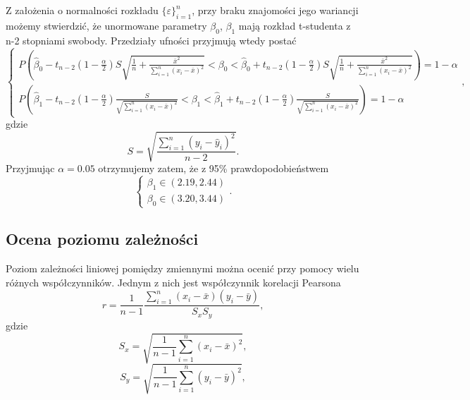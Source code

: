 \documentclass{article}
\theoremstyle{break}
\begin{document}
Z założenia o normalności rozkładu $\{\varepsilon\}_{i=1}^{n}$, przy braku znajomości jego wariancji możemy stwierdzić, że unormowane parametry $\beta_0$, $\beta_1$ mają rozkład t-studenta z n-2 stopniami swobody. Przedziały ufności przyjmują wtedy postać
\begin{equation}
\left\{ \begin{array}{ll}
	P\left(\hat{\beta}_{0}-t_{n-2}(1-\frac{\alpha}{2})S\sqrt{\frac{1}{n}+\frac{\bar{x}^{2}}{\sum_{i=1}^{n}(x_i-\bar{x})^2}} < \beta_{0} < \hat{\beta}_{0}+t_{n-2}(1-\frac{\alpha}{2})S\sqrt{\frac{1}{n}+\frac{\bar{x}^{2}}{\sum_{i=1}^{n}(x_i-\bar{x})^2}}\right) = 1-\alpha\\
	P\left(\hat{\beta}_{1}-t_{n-2}(1-\frac{\alpha}{2})\frac{S}{\sqrt{\sum_{i=1}^{n}(x_i-\bar{x})^2}} < \beta_{1} < \hat{\beta}_{1}+t_{n-2}(1-\frac{\alpha}{2})\frac{S}{\sqrt{\sum_{i=1}^{n}(x_i-\bar{x})^2}}\right) = 1-\alpha
\end{array} \right.,
\end{equation} gdzie
\begin{equation}
	S = \sqrt{\frac{\sum_{i=1}^{n}(y_i - \hat{y}_i)^2}{n-2}}.
\end{equation}
Przyjmując $\alpha = 0.05$ otrzymujemy zatem, że z 95\% prawdopodobieństwem
\begin{equation}
	\left\{ \begin{array}{ll}
		\beta_{1} \in (2.19, 2.44)\\
		\beta_{0} \in (3.20, 3.44)
	\end{array} \right..
\end{equation}

\subsection{Ocena poziomu zależności}

Poziom zależności liniowej pomiędzy zmiennymi można ocenić przy pomocy wielu różnych współczynników. Jednym z nich jest współczynnik korelacji Pearsona
\begin{equation}
	r = \frac{1}{n-1}\frac{\sum_{i=1}^{n}(x_i-\bar{x})(y_i-\bar{y})}{S_{x}S_{y}},
\end{equation}
gdzie
\begin{equation}
S_{x} = \sqrt{\frac{1}{n-1}\sum_{i=1}^{n}(x_{i}-\bar{x})^{2}},
\end{equation}
\begin{equation}
S_{y} = \sqrt{\frac{1}{n-1}\sum_{i=1}^{n}(y_{i}-\bar{y})^{2}},
\end{equation}
\end{document}
